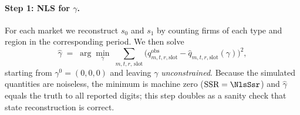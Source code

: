 \documentclass[12pt]{article}
\begin{document}
\paragraph{Step 1: NLS for $\gamma$.}
For each market we reconstruct $s_0$ and $s_1$ by counting firms of each
type and region in the corresponding period. We then solve
\begin{equation}
  \widehat{\gamma} \;=\; \arg\min_{\gamma}\;
  \sum_{m,t,r,\,\mathrm{slot}}
  \bigl( q^{\mathrm{obs}}_{m,t,r,\mathrm{slot}}
       - \hat{q}_{m,t,r,\mathrm{slot}}(\gamma) \bigr)^2,
  \label{eq:nls_gamma}
\end{equation}
starting from $\gamma^0 = (0,0,0)$ and leaving $\gamma$
\emph{unconstrained}. Because the simulated quantities are noiseless, the
minimum is machine zero ($\text{SSR} = \NlsSsr$) and $\widehat{\gamma}$
equals the truth to all reported digits; this step doubles as a sanity
check that state reconstruction is correct.
\end{document}
